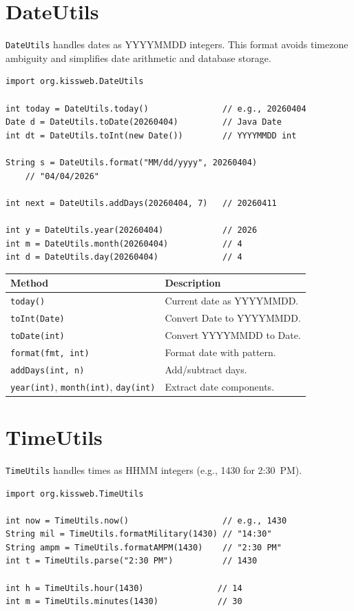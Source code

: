 \section{DateUtils}
\label{sec:util-dateutils}

\texttt{DateUtils} handles dates as YYYYMMDD integers.  This format avoids timezone ambiguity and simplifies date arithmetic and database storage.

\begin{lstlisting}[style=groovy]
import org.kissweb.DateUtils

int today = DateUtils.today()               // e.g., 20260404
Date d = DateUtils.toDate(20260404)         // Java Date
int dt = DateUtils.toInt(new Date())        // YYYYMMDD int

String s = DateUtils.format("MM/dd/yyyy", 20260404)
    // "04/04/2026"

int next = DateUtils.addDays(20260404, 7)   // 20260411

int y = DateUtils.year(20260404)            // 2026
int m = DateUtils.month(20260404)           // 4
int d = DateUtils.day(20260404)             // 4
\end{lstlisting}

\begin{longtable}{P{4.8cm}P{5.7cm}}
\toprule
\textbf{Method} & \textbf{Description} \\
\midrule
\endhead
\texttt{today()} & Current date as YYYYMMDD. \\
\texttt{toInt(Date)} & Convert Date to YYYYMMDD. \\
\texttt{toDate(int)} & Convert YYYYMMDD to Date. \\
\texttt{format(fmt, int)} & Format date with pattern. \\
\texttt{addDays(int, n)} & Add/subtract days. \\
\texttt{year(int)}, \texttt{month(int)}, \texttt{day(int)} & Extract date components. \\
\bottomrule
\end{longtable}

\section{TimeUtils}
\label{sec:util-timeutils}

\texttt{TimeUtils} handles times as HHMM integers (e.g., 1430 for 2:30~PM).

\begin{lstlisting}[style=groovy]
import org.kissweb.TimeUtils

int now = TimeUtils.now()                   // e.g., 1430
String mil = TimeUtils.formatMilitary(1430) // "14:30"
String ampm = TimeUtils.formatAMPM(1430)    // "2:30 PM"
int t = TimeUtils.parse("2:30 PM")          // 1430

int h = TimeUtils.hour(1430)               // 14
int m = TimeUtils.minutes(1430)            // 30
\end{lstlisting}

